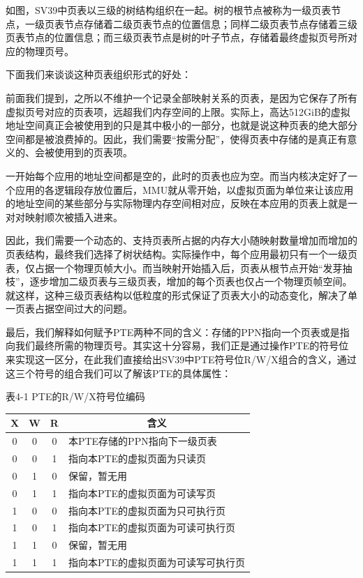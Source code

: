 如图，SV39中页表以三级的树结构组织在一起。树的根节点被称为一级页表节点，一级页表节点存储着二级页表节点的位置信息；同样二级页表节点存储着三级页表节点的位置信息；而三级页表节点是树的叶子节点，存储着最终虚拟页号所对应的物理页号。

下面我们来谈谈这种页表组织形式的好处：

前面我们提到，之所以不维护一个记录全部映射关系的页表，是因为它保存了所有虚拟页号对应的页表项，远超我们内存空间的上限。实际上，高达512GiB的虚拟地址空间真正会被使用到的只是其中极小的一部分，也就是说这种页表的绝大部分空间都是被浪费掉的。因此，我们需要“按需分配”，使得页表中存储的是真正有意义的、会被使用到的页表项。

一开始每个应用的地址空间都是空的，此时的页表也应为空。而当内核决定好了一个应用的各逻辑段存放位置后，MMU就从零开始，以虚拟页面为单位来让该应用的地址空间的某些部分与实际物理内存空间相对应，反映在本应用的页表上就是一对对映射顺次被插入进来。

因此，我们需要一个动态的、支持页表所占据的内存大小随映射数量增加而增加的页表结构，最终我们选择了树状结构。实际操作中，每个应用最初只有一个一级页表，仅占据一个物理页帧大小。而当映射开始插入后，页表从根节点开始“发芽抽枝”，逐步增加二级页表与三级页表，增加的每个页表也仅占一个物理页帧空间。就这样，这种三级页表结构以低粒度的形式保证了页表大小的动态变化，解决了单一页表占据空间过大的问题。

最后，我们解释如何赋予PTE两种不同的含义：存储的PPN指向一个页表或是指向我们最终所需的物理页号。其实这十分容易，我们正是通过操作PTE的符号位来实现这一区分，在此我们直接给出SV39中PTE符号位R/W/X组合的含义，通过这三个符号的组合我们可以了解该PTE的具体属性：

\begin{table}[h]
\begin{center}
表4-1 PTE的R/W/X符号位编码 \\
\begin{tabular}{|c|cc|c}
	\hline
	X & \multicolumn{1}{c|}{W} & R & \multicolumn{1}{c|}{含义} \\
	\hline
	0 & \multicolumn{1}{c|}{0} & 0 & \multicolumn{1}{l|}{本PTE存储的PPN指向下一级页表} \\
	0 & \multicolumn{1}{c|}{0} & 1 & \multicolumn{1}{l|}{指向本PTE的虚拟页面为只读页} \\
	0 & \multicolumn{1}{c|}{1} & 0 & \multicolumn{1}{l|}{保留，暂无用} \\
	0 & \multicolumn{1}{c|}{1} & 1 & \multicolumn{1}{l|}{指向本PTE的虚拟页面为可读写页} \\
	1 & \multicolumn{1}{c|}{0} & 0 & \multicolumn{1}{l|}{指向本PTE的虚拟页面为只可执行页} \\
	1 & \multicolumn{1}{c|}{0} & 1 & \multicolumn{1}{l|}{指向本PTE的虚拟页面为可读可执行页} \\
	1 & \multicolumn{1}{c|}{1} & 0 & \multicolumn{1}{l|}{保留，暂无用} \\
	1 & \multicolumn{1}{c|}{1} & 1 & \multicolumn{1}{l|}{指向本PTE的虚拟页面为可读写可执行页} \\
	\hline
\end{tabular}
\end{center}
\end{table}\FloatBarrier

